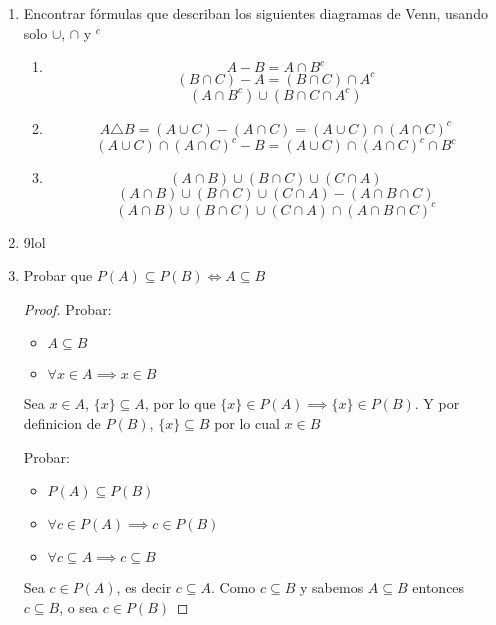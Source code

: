 \documentclass[../practica.root.tex]{subfiles}
\begin{document}
\begin{enumerate}
    \item Encontrar fórmulas que describan los siguientes diagramas de Venn, usando solo $\cup$, $\cap$ y $^c$
          \begin{enumerate}
              \item
                    \[ A - B = A \cap B^c \]
                    \[ (B \cap C) - A = (B \cap C) \cap A^c \]
                    \[ \boxed{(A \cap B^c) \cup (B \cap C \cap A^c)} \]
              \item
                    \[ A \triangle B = (A \cup C) - (A \cap C) = (A \cup C) \cap (A \cap C)^c \]
                    \[ (A \cup C) \cap (A \cap C)^c - B = \boxed{(A \cup C) \cap (A \cap C)^c \cap B^c} \]
              \item
                    \[ (A \cap B) \cup (B \cap C) \cup (C \cap A) \]
                    \[ (A \cap B) \cup (B \cap C) \cup (C \cap A) - (A \cap B \cap C) \]
                    \[ \boxed{(A \cap B) \cup (B \cap C) \cup (C \cap A) \cap (A \cap B \cap C)^c} \]
          \end{enumerate}

    \item 9lol

    \item Probar que $P(A) \subseteq P(B) \iff A \subseteq B$
          \begin{proof}
              Probar:
              \begin{itemize}
                  \item $A \subseteq B$
                  \item $\forall x \in A \implies x \in B$
              \end{itemize}
              Sea $x \in A$, $\{x\} \subseteq A$, por lo que $\{x\} \in P(A) \implies \{x\} \in P(B)$.
              Y por definicion de $P(B)$, $\{x\} \subseteq B$ por lo cual $x \in B$

              Probar:
              \begin{itemize}
                  \item $P(A) \subseteq P(B)$
                  \item $\forall c \in P(A) \implies c \in P(B)$
                  \item $\forall c \subseteq A \implies c \subseteq B$
              \end{itemize}

              Sea $c \in P(A)$, es decir $c \subseteq A$.
              Como $c \subseteq B$ y sabemos $A \subseteq B$ entonces $c \subseteq B$, o sea $c \in P(B)$
          \end{proof}


\end{enumerate}
\end{document}
